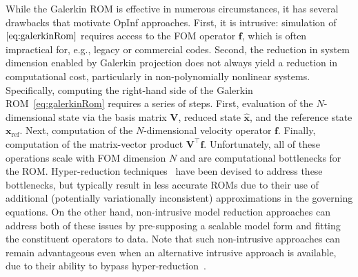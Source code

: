 \documentclass[3p,computermodern,11pt]{elsarticle}
\numberwithin{equation}{section}
\newcommand{\reducedState}{\hat{\state}}
\newcommand{\state}{\boldsymbol x}
\newcommand{\refState}{\state_{\text{ref}}}
\newcommand{\romBasis}{\mathbf{V}}
\newcommand{\velocity}{\boldsymbol f}
\newcommand{\fomDim}{N}
\begin{document}
While the Galerkin ROM is effective in numerous circumstances, it has several drawbacks that motivate OpInf approaches. First, it is intrusive: simulation of $\eqref{eq:galerkinRom}$ requires access to the FOM operator $\velocity$, which is often impractical for, e.g., legacy or commercial codes. Second, the reduction in system dimension enabled by Galerkin projection does not always yield a reduction in computational cost, particularly in non-polynomially nonlinear systems. Specifically, computing the right-hand side of the Galerkin ROM~\eqref{eq:galerkinRom} requires a series of steps.  First, evaluation of the $\fomDim$-dimensional state via the basis matrix $\romBasis$, reduced state $\reducedState$, and the reference state $\refState$. Next, computation of the $\fomDim$-dimensional velocity operator $\velocity$. Finally, computation of the matrix-vector product $\romBasis^\intercal \velocity$. Unfortunately, all of these operations scale with FOM dimension $N$ and are computational bottlenecks for the ROM. Hyper-reduction techniques~\cite{BARRAULT2004667,ChSo10,YANO20191104,ecsw,Carlberg:2011, CarlbergGnat} have been devised to address these bottlenecks, but typically result in less accurate ROMs due to their use of additional (potentially variationally inconsistent) approximations in the governing equations. On the other hand, non-intrusive model reduction approaches can address both of these issues by pre-supposing a scalable model form and fitting the constituent operators to data. Note that such non-intrusive approaches can remain advantageous even when an alternative intrusive approach is available, due to their ability to bypass hyper-reduction~\cite{GaWaZh20}. 
\end{document}
